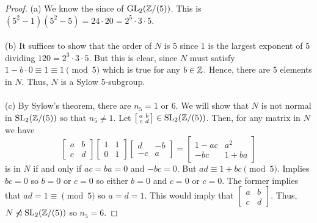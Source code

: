 \begin{proof}
(a) We know the since of $\operatorname{GL}_2(\mathbb{Z}/(5))$. This is $(5^2-1)(5^2-5)=24\cdot
20=2^5\cdot 3\cdot 5$.
\\\\
(b) It suffices to show that the order of $N$ is $5$ since $1$ is the
largest exponent of $5$ dividing $120=2^3\cdot 3\cdot 5$. But this is
clear, since $N$ must satisfy $1-b\cdot 0\equiv 1\equiv 1\pmod{5}$ which is
true for any $b\in\mathbb{Z}$. Hence, there are $5$ elements in $N$. Thus, $N$ is
a Sylow $5$-subgroup.
\\\\
(c) By Sylow's theorem, there are $n_5=1$ or $6$. We will show that $N$ is
not normal in $\operatorname{SL}_2(\mathbb{Z}/(5))$ so that $n_5\neq 1$. Let
$\left[\begin{smallmatrix}a&b\\c&d\end{smallmatrix}\right]\in\operatorname{SL}_2(\mathbb{Z}/(5))$. Then,
for any matrix in $N$ we have
\[
\begin{bmatrix}
a&b\\c&d
\end{bmatrix}
\begin{bmatrix}
1&1\\0&1
\end{bmatrix}
\begin{bmatrix}
d&-b\\
-c&a
\end{bmatrix}
=
\begin{bmatrix}
1-ac&a^2\\-bc&1+ba
\end{bmatrix}
\]
is in $N$ if and only if $ac=ba=0$ and $-bc=0$. But $ad\equiv
1+bc\pmod{5}$. Implies $bc=0$ so $b=0$ or $c=0$ so either $b=0$ and $c=0$
or $c=0$. The former implies that $ad=1\equiv\pmod{5}$ so $a=d=1$. This
would imply that
$\left[\begin{smallmatrix}a&b\\c&d\end{smallmatrix}\right]$. Thus,
$N\centernot\nlhd\SL_2(\bbZ/(5))$ so $n_5=6$.
\end{proof}

